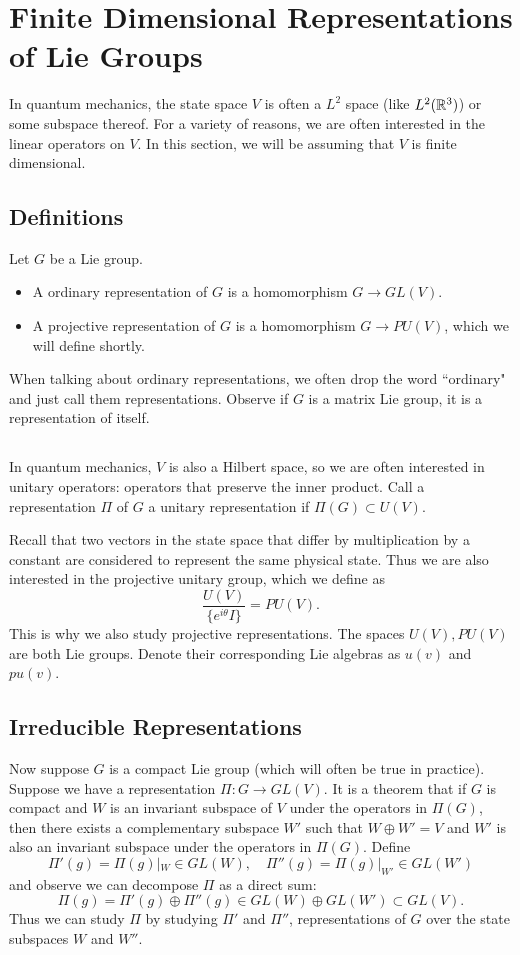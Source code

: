 \section{Finite Dimensional Representations of Lie Groups}
In quantum mechanics, the state space $V$ is often a $L^2$ space (like $L^2({\mathbb R}^3)$) or some subspace thereof. For a variety of reasons, we are often interested in the linear operators on $V$. In this section, we will be assuming that $V$ is finite dimensional.

\subsection{Definitions}
Let $G$ be a Lie group.
\begin{itemize}
    \item A ordinary representation of $G$ is a homomorphism $G \rightarrow GL(V)$.
    \item A projective representation of $G$ is a homomorphism $G \rightarrow PU(V)$, which we will define shortly.
\end{itemize}
When talking about ordinary representations, we often drop the word ``ordinary" and just call them representations. Observe if $G$ is a matrix Lie group, it is a representation of itself.

\subsection{}
In quantum mechanics, $V$ is also a Hilbert space, so we are often interested in unitary operators: operators that preserve the inner product. Call a representation $\Pi$ of $G$ a unitary representation if $\Pi(G) \subset U(V)$.

Recall that two vectors in the state space that differ by multiplication by a constant are considered to represent the same physical state. Thus we are also interested in the projective unitary group, which we define as
\[
    \frac{U(V)}{\{e^{i\theta}I\}} = PU(V).
\]
This is why we also study projective representations. The spaces $U(V), PU(V)$ are both Lie groups. Denote their corresponding Lie algebras as $u(v)$ and $pu(v)$.

\subsection{Irreducible Representations}
Now suppose $G$ is a compact Lie group (which will often be true in practice). Suppose we have a representation $\Pi: G \rightarrow GL(V)$. It is a theorem that if $G$ is compact and $W$ is an invariant subspace of $V$ under the operators in $\Pi(G)$, then there exists a complementary subspace $W'$ such that $W \oplus W' = V$ and $W'$ is also an invariant subspace under the operators in $\Pi(G)$. Define
\[
    \Pi'(g) = \Pi(g)|_W \in GL(W), \quad \Pi''(g) = \Pi(g)|_{W'} \in GL(W')
\]
and observe we can decompose $\Pi$ as a direct sum:
\[
    \Pi(g) = \Pi'(g) \oplus \Pi''(g) \in GL(W) \oplus GL(W') \subset GL(V).
\]
Thus we can study $\Pi$ by studying $\Pi'$ and $\Pi''$, representations of $G$ over the state subspaces $W$ and $W''$.


